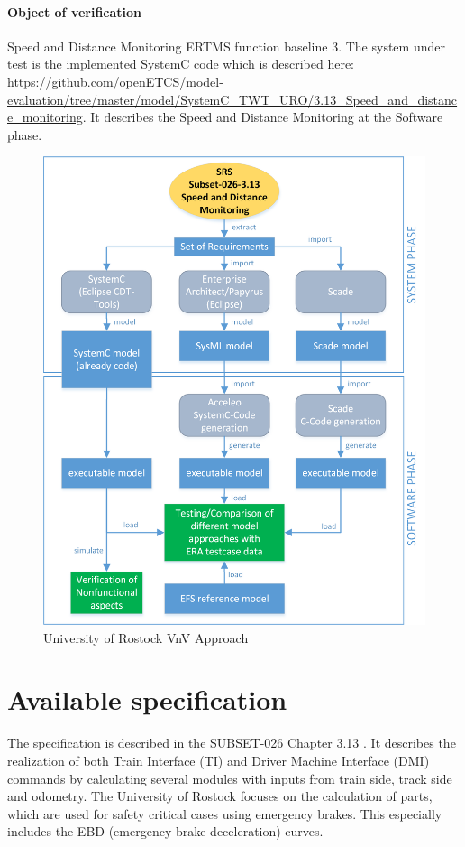 \paragraph{Object of verification}  Speed and Distance Monitoring ERTMS function baseline 3.
The system under test is the implemented SystemC code which is described here: \url{https://github.com/openETCS/model-evaluation/tree/master/model/SystemC_TWT_URO/3.13_Speed_and_distance_monitoring}. It describes the Speed and Distance Monitoring at the Software phase.
\nl

\begin{figure}[h]
\centering
\includegraphics[width=.80\textwidth]{schema/UniRostockApproach.png}
\vspace{4mm}
\caption{University of Rostock VnV Approach}
\label{fig:University of Rostock VnV Approach} 
\end{figure}

\section{Available specification}

The specification is described in the SUBSET-026 Chapter 3.13 \cite{unisig_subset-026_2012}. It describes the realization of both Train Interface (TI) and Driver Machine Interface (DMI) commands by calculating several modules with inputs from train side, track side and odometry. The University of Rostock focuses on the calculation of parts, which are used for safety critical cases using emergency brakes. This especially includes the EBD (emergency brake deceleration) curves.

